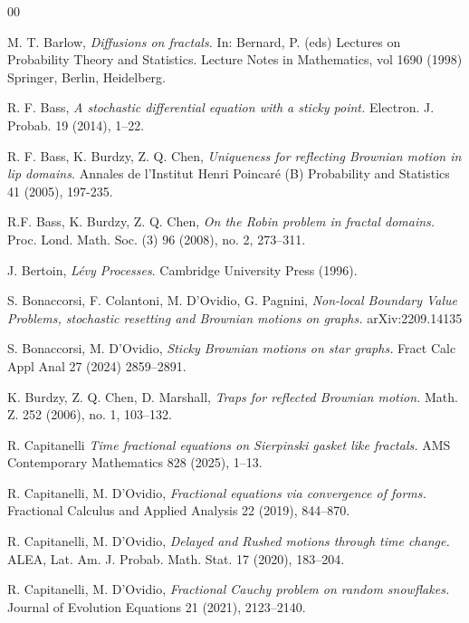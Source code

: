 \documentclass[[11pt,a4paper,reqno]{article}
\numberwithin{equation}{section}
\begin{document}
\small{
\begin{thebibliography}{00}

 {\sc  M. T. Barlow}, \emph{Diffusions on fractals.} In: Bernard, P. (eds) Lectures on Probability Theory and Statistics. Lecture Notes in Mathematics, vol 1690 (1998) Springer, Berlin, Heidelberg.


 {\sc R. F. Bass},
\emph{A stochastic differential equation with a sticky point.} 
Electron. J. Probab. 19 (2014), 1--22. 

{\sc R. F. Bass, K. Burdzy, Z. Q. Chen},
\emph{Uniqueness for reflecting Brownian motion in lip domains.}
Annales de l'Institut Henri Poincar\'{e} (B) Probability and Statistics 41 (2005),  197-235.

{\sc R.F. Bass, K. Burdzy, Z. Q. Chen}, 
\emph{On the Robin problem in fractal domains.} 
Proc. Lond. Math. Soc. (3) 96 (2008), no. 2, 273--311.

{\sc J. Bertoin,}
\emph{L\'{e}vy Processes}.
Cambridge University Press (1996). 


{\sc S. Bonaccorsi, F. Colantoni, M. D'Ovidio, G. Pagnini},
\emph{ Non-local Boundary Value Problems, stochastic resetting and Brownian motions on graphs.} arXiv:2209.14135 


{\sc S. Bonaccorsi, M. D'Ovidio},
\emph{Sticky Brownian motions on star graphs.}
Fract Calc Appl Anal 27 (2024) 2859--2891. 

{\sc K. Burdzy, Z. Q. Chen, D. Marshall},
\emph{Traps for reflected Brownian motion.}
Math. Z. 252 (2006), no. 1, 103--132.
 
 
 
  {\sc R. Capitanelli}
\emph{Time fractional equations on Sierpinski gasket like fractals.} AMS Contemporary Mathematics 828 (2025), 1--13.

{\sc  R. Capitanelli, M. D'Ovidio,}
\emph{Fractional equations via convergence of forms.}
{Fractional Calculus and Applied Analysis 22 (2019), 844--870.}

{\sc R. Capitanelli, M. D'Ovidio},
\emph{Delayed and Rushed motions through time change.}
ALEA, Lat. Am. J. Probab. Math. Stat. 17 (2020), 183--204. 



{\sc R. Capitanelli, M. D'Ovidio,} 
\emph{Fractional Cauchy problem on random snowflakes.} Journal of Evolution Equations  21 (2021), 2123--2140. 



\end{thebibliography}}
\end{document}
